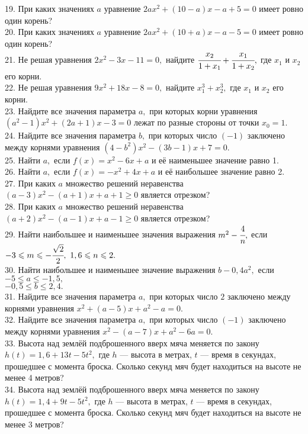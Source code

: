 19. При каких значениях $a$ уравнение $2ax^2+(10-a)x-a+5=0$ имеет ровно один корень?\\
20. При каких значениях $a$ уравнение $2ax^2+(10+a)x-a-5=0$ имеет ровно один корень?\\
21. Не решая уравнения $2x^2-3x-11=0,$ найдите $\cfrac{x_2}{1+x_1}+\cfrac{x_1}{1+x_2},$ где $x_1$ и $x_2$ его корни.\\
22. Не решая уравнения $9x^2+18x-8=0,$ найдите $x_1^3+x_2^3,$ где $x_1$ и $x_2$ его корни.\\
23. Найдите все значения параметра $a,$ при которых корни уравнения $(a^2-1)x^2+(2a+1)x-3=0$ лежат по разные стороны от точки $x_0=1.$\\
24. Найдите все значения параметра $b,$ при которых число $(-1)$ заключено между корнями уравнения $(4-b^2)x^2-(3b-1)x+7=0.$\\
25. Найти $a,$ если $f(x)=x^2-6x+a$ и её наименьшее значение равно 1.\\
26. Найти $a,$ если $f(x)=-x^2+4x+a$ и её наибольшее значение равно 2.\\
27. При каких $a$ множество решений неравенства $(a-3)x^2-(a+1)x+a+1\geqslant0$ является отрезком?\\
28. При каких $a$ множество решений неравенства $(a+2)x^2-(a-1)x+a-1\geqslant0$ является отрезком?\\
29. Найти наибольшее и наименьшее значения выражения $m^2-\cfrac{4}{n},$ если $-3\leqslant m\leqslant-\cfrac{\sqrt{2}}{2},\ 1,6\leqslant n\leqslant 2.$\\
30. Найти наибольшее и наименьшее значение выражения $b-0,4a^2,$ если $-5\leqslant a\leqslant-1,5,$\\$-0,5\leqslant b\leqslant2,4.$\\
31. Найдите все значения параметра $a,$ при которых число $2$ заключено между корнями уравнения $x^2+(a-5)x+a^2-a=0.$\\
32. Найдите все значения параметра $a,$ при которых число $(-1)$ заключено между корнями уравнения $x^2-(a-7)x+a^2-6a=0.$\\
33. Высота над землёй подброшенного вверх мяча меняется по закону $h(t)=1,6+13t-5t^2,$ где $h$ --- высота в метрах, $t$ --- время в секундах, прошедшее с момента броска. Сколько секунд мяч будет находиться на высоте не менее 4 метров?\\
34. Высота над землёй подброшенного вверх мяча меняется по закону $h(t)=1,4+9t-5t^2,$ где $h$ --- высота в метрах, $t$ --- время в секундах, прошедшее с момента броска. Сколько секунд мяч будет находиться на высоте не менее 3 метров?\\
